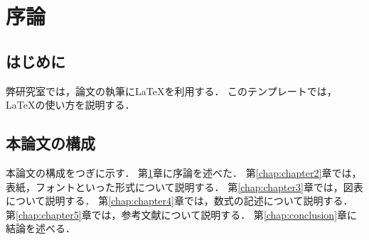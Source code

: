 \chapter{序論}\label{chap:introduction}

\section{はじめに}
弊研究室では，論文の執筆に\LaTeX を利用する．
このテンプレートでは，\LaTeX の使い方を説明する．

\section{本論文の構成}
本論文の構成をつぎに示す．
第\ref{chap:introduction}章に序論を述べた．
第\ref{chap:chapter2}章では，表紙，フォントといった形式について説明する．
第\ref{chap:chapter3}章では，図表について説明する．
第\ref{chap:chapter4}章では，数式の記述について説明する．
第\ref{chap:chapter5}章では，参考文献について説明する．
第\ref{chap:conclusion}章に結論を述べる．
